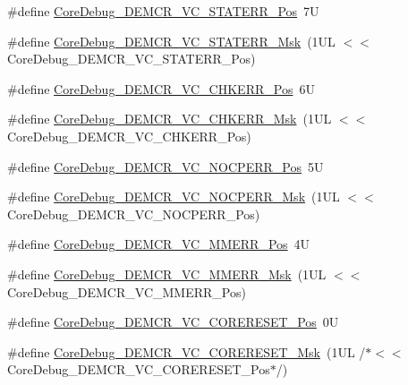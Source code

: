 \begin{DoxyCompactItemize}
\item 
\#define \mbox{\hyperlink{group___c_m_s_i_s___core_debug_ga16f0d3d2ce1e1e8cd762d938ac56c4ac}{Core\+Debug\+\_\+\+D\+E\+M\+C\+R\+\_\+\+V\+C\+\_\+\+S\+T\+A\+T\+E\+R\+R\+\_\+\+Pos}}~7U
\item 
\#define \mbox{\hyperlink{group___c_m_s_i_s___core_debug_gaa38b947d77672c48bba1280c0a642e19}{Core\+Debug\+\_\+\+D\+E\+M\+C\+R\+\_\+\+V\+C\+\_\+\+S\+T\+A\+T\+E\+R\+R\+\_\+\+Msk}}~(1\+U\+L $<$$<$ Core\+Debug\+\_\+\+D\+E\+M\+C\+R\+\_\+\+V\+C\+\_\+\+S\+T\+A\+T\+E\+R\+R\+\_\+\+Pos)
\item 
\#define \mbox{\hyperlink{group___c_m_s_i_s___core_debug_ga10fc7c53bca904c128bc8e1a03072d50}{Core\+Debug\+\_\+\+D\+E\+M\+C\+R\+\_\+\+V\+C\+\_\+\+C\+H\+K\+E\+R\+R\+\_\+\+Pos}}~6U
\item 
\#define \mbox{\hyperlink{group___c_m_s_i_s___core_debug_ga2f98b461d19746ab2febfddebb73da6f}{Core\+Debug\+\_\+\+D\+E\+M\+C\+R\+\_\+\+V\+C\+\_\+\+C\+H\+K\+E\+R\+R\+\_\+\+Msk}}~(1\+U\+L $<$$<$ Core\+Debug\+\_\+\+D\+E\+M\+C\+R\+\_\+\+V\+C\+\_\+\+C\+H\+K\+E\+R\+R\+\_\+\+Pos)
\item 
\#define \mbox{\hyperlink{group___c_m_s_i_s___core_debug_gac9d13eb2add61f610d5ced1f7ad2adf8}{Core\+Debug\+\_\+\+D\+E\+M\+C\+R\+\_\+\+V\+C\+\_\+\+N\+O\+C\+P\+E\+R\+R\+\_\+\+Pos}}~5U
\item 
\#define \mbox{\hyperlink{group___c_m_s_i_s___core_debug_ga03ee58b1b02fdbf21612809034562f1c}{Core\+Debug\+\_\+\+D\+E\+M\+C\+R\+\_\+\+V\+C\+\_\+\+N\+O\+C\+P\+E\+R\+R\+\_\+\+Msk}}~(1\+U\+L $<$$<$ Core\+Debug\+\_\+\+D\+E\+M\+C\+R\+\_\+\+V\+C\+\_\+\+N\+O\+C\+P\+E\+R\+R\+\_\+\+Pos)
\item 
\#define \mbox{\hyperlink{group___c_m_s_i_s___core_debug_ga444454f7c7748e76cd76c3809c887c41}{Core\+Debug\+\_\+\+D\+E\+M\+C\+R\+\_\+\+V\+C\+\_\+\+M\+M\+E\+R\+R\+\_\+\+Pos}}~4U
\item 
\#define \mbox{\hyperlink{group___c_m_s_i_s___core_debug_gad420a9b60620584faaca6289e83d3a87}{Core\+Debug\+\_\+\+D\+E\+M\+C\+R\+\_\+\+V\+C\+\_\+\+M\+M\+E\+R\+R\+\_\+\+Msk}}~(1\+U\+L $<$$<$ Core\+Debug\+\_\+\+D\+E\+M\+C\+R\+\_\+\+V\+C\+\_\+\+M\+M\+E\+R\+R\+\_\+\+Pos)
\item 
\#define \mbox{\hyperlink{group___c_m_s_i_s___core_debug_ga9fcf09666f7063a7303117aa32a85d5a}{Core\+Debug\+\_\+\+D\+E\+M\+C\+R\+\_\+\+V\+C\+\_\+\+C\+O\+R\+E\+R\+E\+S\+E\+T\+\_\+\+Pos}}~0U
\item 
\#define \mbox{\hyperlink{group___c_m_s_i_s___core_debug_ga906476e53c1e1487c30f3a1181df9e30}{Core\+Debug\+\_\+\+D\+E\+M\+C\+R\+\_\+\+V\+C\+\_\+\+C\+O\+R\+E\+R\+E\+S\+E\+T\+\_\+\+Msk}}~(1\+U\+L /$\ast$$<$$<$ Core\+Debug\+\_\+\+D\+E\+M\+C\+R\+\_\+\+V\+C\+\_\+\+C\+O\+R\+E\+R\+E\+S\+E\+T\+\_\+\+Pos$\ast$/)

\end{DoxyCompactItemize}
